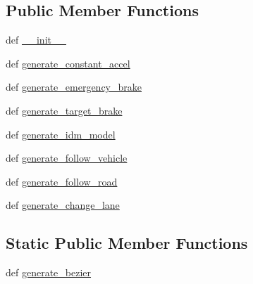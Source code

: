 \subsection*{Public Member Functions}
\begin{DoxyCompactItemize}
\item 
def \hyperlink{classimplementation_1_1trajectory__gen_1_1trajectory__generation_1_1_trajectory_generator_ad143765e7c7c4e2eaca2197fd173b145}{\+\_\+\+\_\+init\+\_\+\+\_\+}
\item 
def \hyperlink{classimplementation_1_1trajectory__gen_1_1trajectory__generation_1_1_trajectory_generator_a443496ede5af3204ce5e09d0cbc9e690}{generate\+\_\+constant\+\_\+accel}
\item 
def \hyperlink{classimplementation_1_1trajectory__gen_1_1trajectory__generation_1_1_trajectory_generator_ad0f21f77d660250f45ba6a51f11c5cbe}{generate\+\_\+emergency\+\_\+brake}
\item 
def \hyperlink{classimplementation_1_1trajectory__gen_1_1trajectory__generation_1_1_trajectory_generator_ae927de2628c44e291e63bc6a9a3e890c}{generate\+\_\+target\+\_\+brake}
\item 
def \hyperlink{classimplementation_1_1trajectory__gen_1_1trajectory__generation_1_1_trajectory_generator_a724b59772d6de51bb4cd51b881eb041e}{generate\+\_\+idm\+\_\+model}
\item 
def \hyperlink{classimplementation_1_1trajectory__gen_1_1trajectory__generation_1_1_trajectory_generator_a1738a23811dcc01b648d8dbfadc30984}{generate\+\_\+follow\+\_\+vehicle}
\item 
def \hyperlink{classimplementation_1_1trajectory__gen_1_1trajectory__generation_1_1_trajectory_generator_a0dc227a0c0d6786e29e80e8aa9415bd4}{generate\+\_\+follow\+\_\+road}
\item 
def \hyperlink{classimplementation_1_1trajectory__gen_1_1trajectory__generation_1_1_trajectory_generator_a671887663c143d428a4b4caa405b953e}{generate\+\_\+change\+\_\+lane}
\end{DoxyCompactItemize}
\subsection*{Static Public Member Functions}
\begin{DoxyCompactItemize}
\item 
def \hyperlink{classimplementation_1_1trajectory__gen_1_1trajectory__generation_1_1_trajectory_generator_ab996bccf9921443878f693c61fc582eb}{generate\+\_\+bezier}
\end{DoxyCompactItemize}
